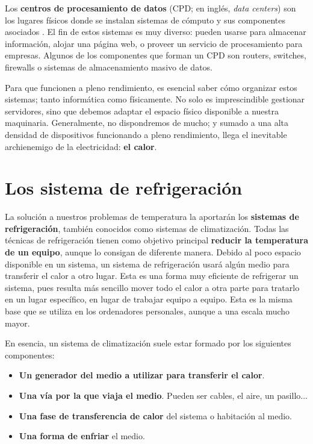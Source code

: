 Los \textbf{centros de procesamiento de datos} (CPD; en inglés, \textit{data centers}) son los lugares físicos donde se instalan sistemas de cómputo y sus componentes asociados \cite{wikipedia-datacenter}. El fin de estos sistemas es muy diverso: pueden usarse para almacenar información, alojar una página web, o proveer un servicio de procesamiento para empresas. Algunos de los componentes que forman un CPD son routers, switches, firewalls o sistemas de almacenamiento masivo de datos. 

Para que funcionen a pleno rendimiento, es esencial saber cómo organizar estos sistemas; tanto informática como físicamente. No solo es imprescindible gestionar servidores, sino que debemos adaptar el espacio físico disponible a nuestra maquinaria. Generalmente, no dispondremos de mucho; y sumado a una alta densidad de dispositivos funcionando a pleno rendimiento, llega el inevitable archienemigo de la electricidad: \textbf{el calor}.

\section{Los sistema de refrigeración}

La solución a nuestros problemas de temperatura la aportarán los \textbf{sistemas de refrigeración}, también conocidos como sistemas de climatización. Todas las técnicas de refrigeración tienen como objetivo principal \textbf{reducir la temperatura de un equipo}, aunque lo consigan de diferente manera. Debido al poco espacio disponible en un sistema, un sistema de refrigeración usará algún medio para transferir el calor a otro lugar. Esta es una forma muy eficiente de refrigerar un sistema, pues resulta más sencillo mover todo el calor a otra parte para tratarlo en un lugar específico, en lugar de trabajar equipo a equipo. Esta es la misma base que se utiliza en los ordenadores personales, aunque a una escala mucho mayor.

En esencia, un sistema de climatización suele estar formado por los siguientes componentes:

\begin{itemize}
    \item \textbf{Un generador del medio a utilizar para transferir el calor}.
    \item \textbf{Una vía por la que viaja el medio}. Pueden ser cables, el aire, un pasillo...
    \item \textbf{Una fase de transferencia de calor} del sistema o habitación al medio.
    \item \textbf{Una forma de enfriar} el medio.
\end{itemize}

